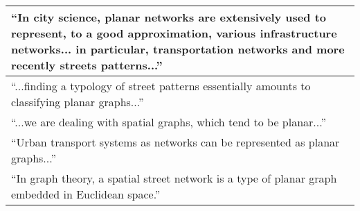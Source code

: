 \begin{tabular}{ | p{\textwidth} | }
\enquote{In city science, planar networks are extensively used to represent, to a good approximation, various infrastructure networks... in particular, transportation networks and more recently streets patterns...} \citep[p.~1]{viana_simplicity_2013} \\ \hline

\enquote{...finding a typology of street patterns essentially amounts to classifying planar graphs...} \citep[p.~2]{louf_typology_2014} \\ \hline

\enquote{...we are dealing with spatial graphs, which tend to be planar...} \citep[p.~2191]{zhong_detecting_2014} \\ \hline

\enquote{Urban transport systems as networks can be represented as planar graphs...} \citep[p.~2]{wang_resilience_2015} \\ \hline

\enquote{In graph theory, a spatial street network is a type of planar graph embedded in Euclidean space.} \citep[p.~168]{law_defining_2017} \\ \hline

\end{tabular}
